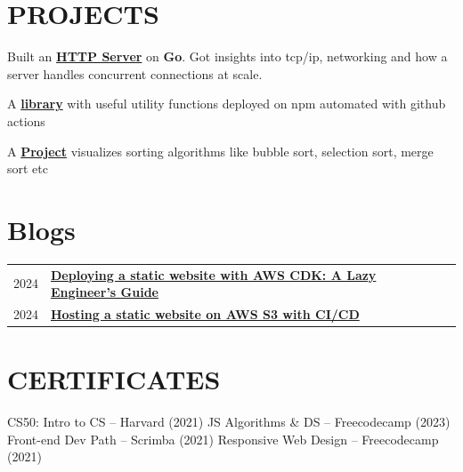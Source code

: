 \documentclass[]{deedy-resume-openfont}
\begin{document}
\begin{minipage}[t]{0.66\textwidth}

\section{PROJECTS}

Built an \textbf{\href{https://github.com/sanishchirayath1/codecrafters-http-server-go}{HTTP Server}} on \textbf{Go}. Got insights into tcp/ip, networking and how a server handles concurrent connections at scale.
\sectionsep

A \textbf{\href{https://www.npmjs.com/package/@sanishchirayath/modern-package-npm}{library}} with useful utility functions deployed on npm automated with github actions
\sectionsep

A \textbf{\href{https://sanishchirayath1.github.io/sorting-visualiser/}{Project}} visualizes sorting algorithms like bubble sort, selection sort, merge sort etc
\sectionsep



\section{Blogs} 
\begin{tabular}{rll}
2024	 & \textbf{\href{https://blogs.hstart.in/automate-aws-infrastructure-deployment-with-aws-cdk-a-lazy-engineers-guide}{Deploying a static website with AWS CDK: A Lazy Engineer's Guide}}\\
2024	 & \textbf{\href{https://blogs.hstart.in/hosting-a-static-website-on-aws-s3-with-cicd}{Hosting a static website on AWS S3 with CI/CD}}\\
\end{tabular}
\sectionsep



\section{CERTIFICATES}
CS50: Intro to CS – Harvard (2021) \textbullet{} JS Algorithms \& DS – Freecodecamp (2023) \textbullet{} Front-end Dev Path – Scrimba (2021) \textbullet{} Responsive Web Design – Freecodecamp (2021)
\sectionsep



\end{minipage} 
\end{document}
